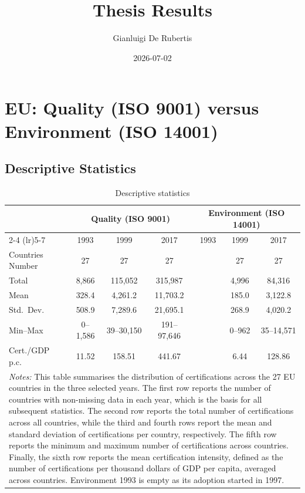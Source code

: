 \documentclass[
  letterpaper,
  DIV=11,
  numbers=noendperiod]{scrartcl}
\title{Thesis Results}
\author{Gianluigi De Rubertis}
\date{2026-07-02}
\begin{document}
\maketitle


\section{EU: Quality (ISO 9001) versus Environment (ISO
14001)}\label{eu-quality-iso-9001-versus-environment-iso-14001}

\subsection{Descriptive Statistics}\label{descriptive-statistics}

\begin{table}[H]\centering
\caption{Descriptive statistics}
\label{tab:desc_stats}
\begin{tabular}{lcccccc}\hline\hline
& \multicolumn{3}{c}{Quality (ISO 9001)} & \multicolumn{3}{c}{Environment (ISO 14001)} \\
\cmidrule(lr){2-4} \cmidrule(lr){5-7}
& 1993 & 1999 & 2017 & 1993 & 1999 & 2017 \\\hline
Countries Number & 27 & 27 & 27 & & 27 & 27 \\
Total & 8,866 & 115,052 & 315,987 & & 4,996 & 84,316 \\
Mean & 328.4 & 4,261.2 & 11,703.2 & & 185.0 & 3,122.8 \\
Std.\ Dev. & 508.9 & 7,289.6 & 21,695.1 & & 268.9 & 4,020.2 \\
Min--Max & 0--1,586 & 39--30,150 & 191--97,646 & & 0--962 & 35--14,571 \\
Cert./GDP p.c. & 11.52 & 158.51 & 441.67 & & 6.44 & 128.86 \\
\hline\hline
\multicolumn{7}{p{0.92\textwidth}}{\footnotesize \textit{Notes:} This table summarises the distribution of certifications across the 27 EU countries in the three selected years. The first row reports the number of countries with non-missing data in each year, which is the basis for all subsequent statistics. The second row reports the total number of certifications across all countries, while the third and fourth rows report the mean and standard deviation of certifications per country, respectively. The fifth row reports the minimum and maximum number of certifications across countries. Finally, the sixth row reports the mean certification intensity, defined as the number of certifications per thousand dollars of GDP per capita, averaged across countries. Environment 1993 is empty as its adoption started in 1997.} \\
\end{tabular}
\end{table}
\end{document}
